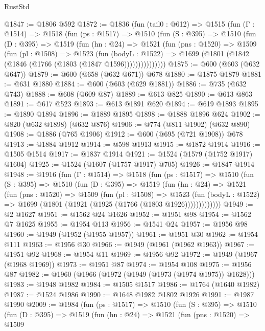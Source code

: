 \begin{lexlean}{RustStd}
\begin{coremodule}
@1847 := @1806 @592
@1872 := @1836
    (fun (tail0 : @612) =>
    @1515
      (fun (Γ : @1514) =>
      @1518
        (fun (ps : @1517) =>
        @1510
          (fun (S : @395) =>
          @1510
            (fun (D : @395) =>
            @1519
              (fun (hn : @24) =>
              @1521
                (fun (pns : @1520) =>
                @1509
                  (fun (pl : @1508) =>
                  @1523
                    (fun (bodyL : @1522) =>
                    @1699 (@1801 (@1842 (@1846 (@1766 (@1803 (@1847 @1596)))))))))))))))
@1875 := @600 (@603 (@632 @647))
@1879 := @600 (@658 (@632 @671)) @678
@1880 := @1875 @1879
@1881 := @631 @1880
@1884 := @600 (@603 (@629 @1881))
@1886 := @735 (@632 @743)
@1888 := @608 (@609 @87)
@1889 := @613 @825
@1890 := @613 @863
@1891 := @617 @523
@1893 := @613 @1891 @620
@1894 := @619 @1893
@1895 := @1890 @1894
@1896 := @1889 @1895
@1898 := @1888 @1896 @624
@1902 := @820 (@632 @1898) (@632 @876)
@1906 := @774 (@811 @1902) (@632 @890)
@1908 := @1886 (@765 @1906)
@1912 := @600 (@695 (@721 @1908)) @678
@1913 := @1884 @1912
@1914 := @598 @1913
@1915 := @1872 @1914
@1916 := @1505 @1514
@1917 := @1837 @1914
@1921 := @1524 (@1579 (@1752 @1917) @1604)
@1925 := @1524 (@1607 (@1757 @1917) @705)
@1926 := @1847 @1914
@1948 := @1916
    (fun (Γ : @1514) =>
    @1518
      (fun (ps : @1517) =>
      @1510
        (fun (S : @395) =>
        @1510
          (fun (D : @395) =>
          @1519
            (fun (hn : @24) =>
            @1521
              (fun (pns : @1520) =>
              @1509
                (fun (pl : @1508) =>
                @1523
                  (fun (bodyL : @1522) =>
                  @1699 (@1801 (@1921 (@1925 (@1766 (@1803 @1926)))))))))))))
@1949 := @2 @1627
@1951 := @1562 @24 @1626
@1952 := @1951 @98
@1954 := @1562 @7 @1625
@1955 := @1954 @113
@1956 := @1541 @24
@1957 := @1956 @98
@1960 := @1949 (@1952 (@1955 @1957))
@1961 := @1951 @30
@1962 := @1954 @111
@1963 := @1956 @30
@1966 := @1949 (@1961 (@1962 @1963))
@1967 := @1951 @92
@1968 := @1954 @11
@1969 := @1956 @92
@1972 := @1949 (@1967 (@1968 @1969))
@1973 := @1951 @87
@1974 := @1954 @108
@1975 := @1956 @87
@1982 := @1960 (@1966 (@1972 (@1949 (@1973 (@1974 @1975)) @1628)))
@1983 := @1948 @1982
@1984 := @1505 @1517
@1986 := @1764 (@1640 @1982)
@1987 := @1524 @1986
@1990 := @1648 @1982 @1802 @1926
@1991 := @1987 @1990
@2009 := @1984
    (fun (ps : @1517) =>
    @1510
      (fun (S : @395) =>
      @1510
        (fun (D : @395) =>
        @1519
          (fun (hn : @24) =>
          @1521
            (fun (pns : @1520) =>
            @1509

\end{coremodule}
\end{lexlean}
